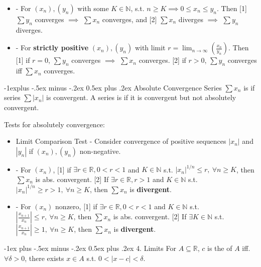 \documentclass[10pt,landscape,letterpaper]{article}
\makeatletter
\renewcommand{\section}{\@startsection{section}{1}{0mm}%
                                {-1ex plus -.5ex minus -.2ex}%
                                {0.5ex plus .2ex}%
                                {\sffamily\large}}
\renewcommand{\subsection}{\@startsection{subsection}{2}{0mm}%
                                {-1explus -.5ex minus -.2ex}%
                                {0.5ex plus .2ex}%
                                {\sffamily\normalsize\itshape}}
\makeatother
\begin{document}
\begin{multicols}{3}
\begin{itemize}
    \item {} - For $(x_n), (y_n)$ with some $K \in \mathbb{N}$, s.t. $n \ge K \implies 0 \le x_n \le y_n$. Then [1] $\sum y_n$ converges $\implies$ $\sum x_n$ converges, and [2] $\sum x_n$ diverges $\implies$ $\sum y_n$ diverges.
    
    \item {} - For \textbf{strictly positive} $(x_n), (y_n)$ with limit $r = \lim_{n \to \infty} (\frac{x_n}{y_n})$. Then [1] if $r = 0$, $\sum y_n$ converges $\implies$ $\sum x_n$ converges. [2] if $r > 0$, $\sum y_n$ converges iff $\sum x_n$ converges.
\end{itemize}





\subsection{Absolute Convergence}
Series $\sum x_n$ is  if series $\sum |x_n|$ is convergent. A series is  if it is convergent but not absolutely convergent.

Tests for absolutely convergence:
\begin{itemize}
    \item Limit Comparison Test - Consider convergence of positive sequences $|x_n|$ and $|y_n|$ if $(x_n), (y_n)$ non-negative.
    \item {} - For $(x_n)$, [1] if $\exists r \in \mathbb{R}, 0 < r < 1$ and $K \in \mathbb{N}$ s.t. $|x_n|^{1/n} \le r, \ \forall n \ge K$, then $\sum x_n$ is abs. convergent. [2] If $\exists r \in \mathbb{R}, r > 1$ and $K \in \mathbb{N}$ s.t. $|x_n|^{1/n} \ge r > 1, \ \forall n \ge K$, then $\sum x_n$ is \textbf{divergent}.
    \item {} - For $(x_n)$ nonzero, [1] if $\exists r \in \mathbb{R}, 0 < r < 1$ and $K \in \mathbb{N}$ s.t. $|\frac{x_{n+1}}{x_n}| \le r, \ \forall n \ge K$, then $\sum x_n$ is abs. convergent. [2] If $\exists K \in \mathbb{N}$ s.t. $|\frac{x_{n+1}}{x_n}| \ge 1, \ \forall n \ge K$, then $\sum x_n$ is \textbf{divergent}.
\end{itemize}





\section{4. Limits}
For $A \subseteq \mathbb{R}$, $c$ is the  of $A$ iff. $\forall \delta > 0$, there exists $x \in A$ s.t. $0< |x-c| < \delta$.


\end{multicols}
\end{document}
